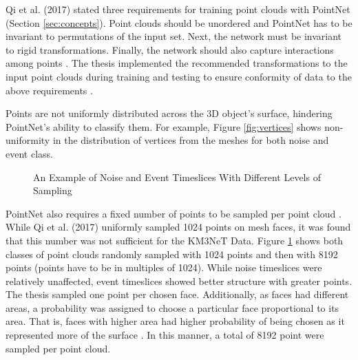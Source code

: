 Qi et al. (2017) stated three requirements for training point clouds with PointNet (Section \ref{sec:concepts}). Point clouds should be unordered and PointNet has to be invariant to permutations of the input set. Next, the network must be invariant to rigid transformations. Finally, the network should also capture interactions among points \cite{qi2017pointnet}. The thesis implemented the recommended transformations to the input point clouds during training and testing to ensure conformity of data to the above requirements \cite{qi2017pointnet}.

Points are not uniformly distributed across the 3D object’s surface, hindering PointNet's ability to classify them. For example, Figure \ref{fig:vertices} shows non-uniformity in the distribution of vertices from the meshes for both noise and event class. 

\begin{figure}[ht!]   
\centering
{}
\hspace{0.01cm}
\hspace{0.01cm}

\caption[]{An Example of Noise and Event Timeslices With Different Levels of Sampling}
\label{fig:sampled}
\end{figure}

PointNet also requires a fixed number of points to be sampled per point cloud \cite{qi2017pointnet}. While Qi et al. (2017) uniformly sampled 1024 points on mesh faces, it was found that this number was not sufficient for the KM3NeT Data.  Figure \ref{fig:sampled} shows both classes of point clouds randomly sampled with 1024 points and then with 8192 points (points have to be in multiples of 1024). While noise timeslices were relatively unaffected, event timeslices showed better structure with greater points. The thesis sampled one point per chosen face. Additionally, as faces had different areas, a probability was assigned to choose a particular face proportional to its area. That is, faces with higher area had higher probability of being chosen as it represented more of the surface \cite{qi2017pointnet}. In this manner, a total of 8192 point were sampled per point cloud.


